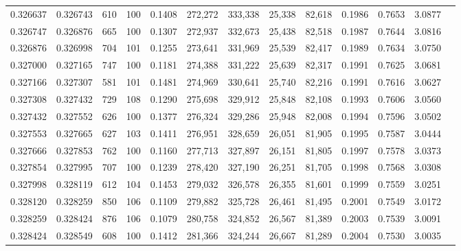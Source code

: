 \begin{tabular}{rrrrrrrrrrrrr}
0.326637 & 0.326743 &   610 & 100 &                                     0.1408 & 272,272 & 333,338 &  25,338 &  82,618 & 0.1986 & 0.7653 & 3.0877 \\
0.326747 & 0.326876 &   665 & 100 &                                     0.1307 & 272,937 & 332,673 &  25,438 &  82,518 & 0.1987 & 0.7644 & 3.0816 \\
0.326876 & 0.326998 &   704 & 101 &                                     0.1255 & 273,641 & 331,969 &  25,539 &  82,417 & 0.1989 & 0.7634 & 3.0750 \\
0.327000 & 0.327165 &   747 & 100 &                                     0.1181 & 274,388 & 331,222 &  25,639 &  82,317 & 0.1991 & 0.7625 & 3.0681 \\
0.327166 & 0.327307 &   581 & 101 &                                     0.1481 & 274,969 & 330,641 &  25,740 &  82,216 & 0.1991 & 0.7616 & 3.0627 \\
0.327308 & 0.327432 &   729 & 108 &                                     0.1290 & 275,698 & 329,912 &  25,848 &  82,108 & 0.1993 & 0.7606 & 3.0560 \\
0.327432 & 0.327552 &   626 & 100 &                                     0.1377 & 276,324 & 329,286 &  25,948 &  82,008 & 0.1994 & 0.7596 & 3.0502 \\
0.327553 & 0.327665 &   627 & 103 &                                     0.1411 & 276,951 & 328,659 &  26,051 &  81,905 & 0.1995 & 0.7587 & 3.0444 \\
0.327666 & 0.327853 &   762 & 100 &                                     0.1160 & 277,713 & 327,897 &  26,151 &  81,805 & 0.1997 & 0.7578 & 3.0373 \\
0.327854 & 0.327995 &   707 & 100 &                                     0.1239 & 278,420 & 327,190 &  26,251 &  81,705 & 0.1998 & 0.7568 & 3.0308 \\
0.327998 & 0.328119 &   612 & 104 &                                     0.1453 & 279,032 & 326,578 &  26,355 &  81,601 & 0.1999 & 0.7559 & 3.0251 \\
0.328120 & 0.328259 &   850 & 106 &                                     0.1109 & 279,882 & 325,728 &  26,461 &  81,495 & 0.2001 & 0.7549 & 3.0172 \\
0.328259 & 0.328424 &   876 & 106 &                                     0.1079 & 280,758 & 324,852 &  26,567 &  81,389 & 0.2003 & 0.7539 & 3.0091 \\
0.328424 & 0.328549 &   608 & 100 &                                     0.1412 & 281,366 & 324,244 &  26,667 &  81,289 & 0.2004 & 0.7530 & 3.0035 \\

\end{tabular}
